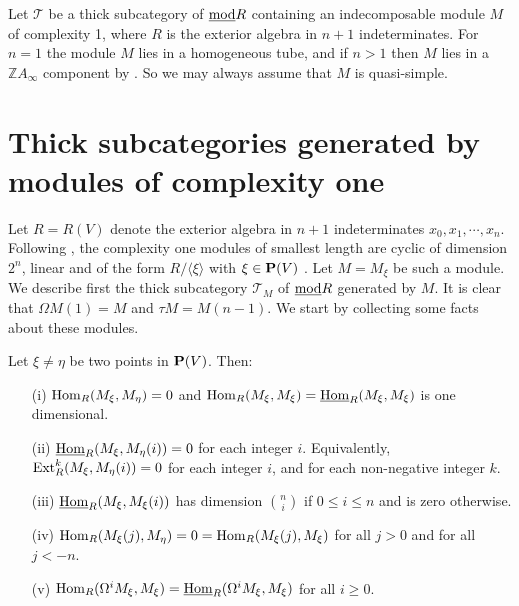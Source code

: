 \documentclass[10pt]{amsart}
\begin{document}
 \noindent Let $\mathcal T$ be a thick subcategory 
of $\underline{\operatorname{mod}} R$ containing an indecomposable  module $M$ of complexity 1, where $R$ is the exterior algebra in $n+1$ indeterminates. 
For $n=1$ the module $M$ lies 
in a homogeneous tube, and if $n>1$ then $M$ lies in a ${\mathbb Z}A_\infty$ component by \cite[Theorem 5.7]{MVZ1}. 
So  we may always assume that $M$ is quasi-simple.


\section{Thick subcategories generated by modules of complexity one}

\noindent Let $R=R(V)$ denote the exterior algebra in $n+1$ indeterminates $x_0, x_1,\cdots, x_n$.  
Following \cite{E}, the complexity one modules of smallest length are cyclic of dimension $2^n$, 
linear and of the form $R/{\langle\xi\rangle}$ with $\xi \in {\bf P}(V)$ . 
Let $M=M_{\xi}$ be such a module. We describe first the thick subcategory $\mathcal T_{M}$ of 
$\underline{\operatorname{mod}} R$ generated by $M$. It is clear that $\Omega M(1)=M$ and $\tau M=M(n-1)$. 
We start by collecting some facts about these modules. 

\begin{lemma}\label{Hom lemma} Let $\xi\neq\eta$ be two points in ${\bf P}(V)$. Then:
\begin{enumerate}
\item[(i)]  $\operatorname{Hom}_R(M_{\xi},M_{\eta})=0$ and
 $\operatorname{Hom}_R(M_{\xi},M_{\xi})=\underline{\operatorname{Hom}}_R(M_{\xi},M_{\xi})$ is one dimensional.
\item[(ii)]   $\underline{\operatorname{Hom}}_R(M_{\xi},M_{\eta}(i))=0$ for each integer $i$. 
Equivalently,  $\operatorname{Ext}\nolimits_R^k(M_{\xi},M_{\eta}(i))=0$ for each integer $i$,  and for each non-negative integer $k$.
\item[(iii)] $\underline{\operatorname{Hom}}_R(M_{\xi},M_{\xi}(i))$ has dimension $\binom{n}{i}$ if $0\le i\le n$
and is zero otherwise.
\item[(iv)] $\operatorname{Hom}_R(M_{\xi}(j),M_{\eta})=0=\operatorname{Hom}_R(M_{\xi}(j),M_{\xi})$ for all $j>0$ and for all \\
$j<-n$.
\item[(v)]  $\operatorname{Hom}_R(\Omega^iM_{\xi},M_{\xi}) = \underline{\operatorname{Hom}}_R(\Omega^iM_{\xi},M_{\xi})$ for all $i\ge 0$.
\end{enumerate} 
\end{lemma}
\end{document}
